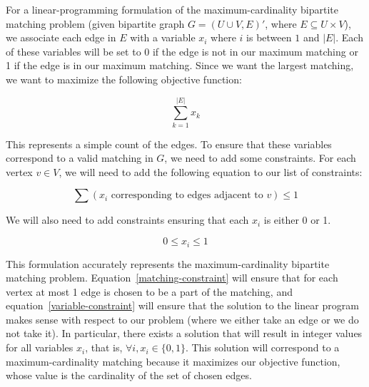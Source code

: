 
For a linear-programming formulation of the maximum-cardinality bipartite matching problem (given bipartite graph $G = (U \cup V, E)'$, where $E \subseteq U \times V$), we associate each edge in $E$ with a variable $x_{i}$ where $i$ is between $1$ and $|E|$. Each of these variables will be set to 0 if the edge is not in our maximum matching or 1 if the edge is in our maximum matching. Since we want the largest matching, we want to maximize the following objective function:

\begin{equation}\label{objective-function}
	\sum_{k=1}^{|E|} x_{k}
\end{equation}

This represents a simple count of the edges. To ensure that these variables correspond to a valid matching in $G$, we need to add some constraints. For each vertex $v \in V$, we will need to add the following equation to our list of constraints:

\begin{equation}\label{matching-constraint}
	\sum (x_{i} \text{ corresponding to edges adjacent to } v) \le 1
\end{equation}

We will also need to add constraints ensuring that each $x_{i}$ is either 0 or 1.

\begin{equation}\label{variable-constraint}
	0 \le x_{i} \le 1
\end{equation}

This formulation accurately represents the maximum-cardinality bipartite matching problem. Equation~\ref{matching-constraint} will ensure that for each vertex at most 1 edge is chosen to be a part of the matching, and equation~\ref{variable-constraint} will ensure that the solution to the linear program makes sense with respect to our problem (where we either take an edge or we do not take it). In particular, there exists a solution that will result in integer values for all variables $x_{i}$, that is, $\forall i, x_{i} \in \{0, 1\}$. This solution will correspond to a maximum-cardinality matching because it maximizes our objective function, whose value is the cardinality of the set of chosen edges.